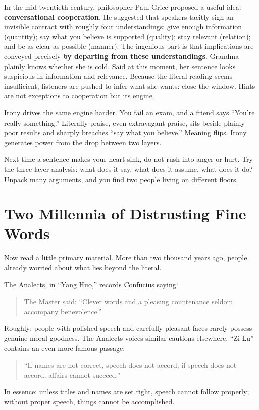 In the mid-twentieth century, philosopher Paul Grice proposed a useful idea: \textbf{conversational cooperation}. He suggested that speakers tacitly sign an invisible contract with roughly four understandings: give enough information (quantity); say what you believe is supported (quality); stay relevant (relation); and be as clear as possible (manner). The ingenious part is that implications are conveyed precisely \textbf{by departing from these understandings}. Grandma plainly knows whether she is cold. Said at this moment, her sentence looks suspicious in information and relevance. Because the literal reading seems insufficient, listeners are pushed to infer what she wants: close the window. Hints are not exceptions to cooperation but its engine.

Irony drives the same engine harder. You fail an exam, and a friend says ``You're really something.'' Literally praise, even extravagant praise, sits beside plainly poor results and sharply breaches ``say what you believe.'' Meaning flips. Irony generates power from the drop between two layers.

Next time a sentence makes your heart sink, do not rush into anger or hurt. Try the three-layer analysis: what does it say, what does it assume, what does it do? Unpack many arguments, and you find two people living on different floors.

\section{Two Millennia of Distrusting Fine Words}
Now read a little primary material. More than two thousand years ago, people already worried about what lies beyond the literal.

The Analects, in ``Yang Huo,'' records Confucius saying:

\begin{quote}
The Master said: ``Clever words and a pleasing countenance seldom accompany benevolence.''
\end{quote}
Roughly: people with polished speech and carefully pleasant faces rarely possess genuine moral goodness. The Analects voices similar cautions elsewhere. ``Zi Lu'' contains an even more famous passage:

\begin{quote}
``If names are not correct, speech does not accord; if speech does not accord, affairs cannot succeed.''
\end{quote}
In essence: unless titles and names are set right, speech cannot follow properly; without proper speech, things cannot be accomplished.

